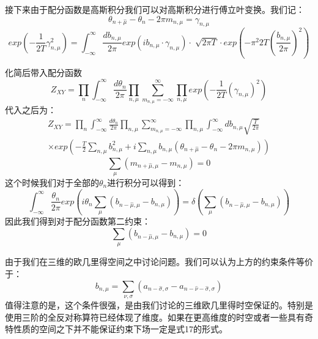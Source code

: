 \documentclass{article}
\begin{document}
接下来由于配分函数是高斯积分我们可以对高斯积分进行傅立叶变换。我们记：
\begin{equation}
    \theta_{n+ \hat \mu} - \theta_n - 2\pi m_{n,\mu} = \gamma_{n,\mu}
\end{equation}
\begin{equation}
    exp(-\frac{1}{2T} \gamma_{n,\mu}^2) = \int_{- \infty}^{\infty} \frac{d b_{n,\mu}}{2 \pi}  exp{(i b_{n,\mu} \cdot \gamma_{n,\mu}) } \cdot \sqrt[]{2 \pi T} \cdot exp{(- \pi^2 2 T (\frac{b_{n,\mu}}{2 \pi})^2)}
\end{equation}

化简后带入配分函数
\begin{equation}
    Z_{XY} = \prod_n \int_{- \infty}^{\infty} \frac{d \theta_n}{2 \pi} \prod_{n,\mu} \sum_{m_{n,\mu} = -\infty}^{\infty}  \prod_{n,\mu} exp ( - \frac{1}{2T}(\gamma_{n,\mu})^2 )
\end{equation}
代入之后为：
\begin{equation}
    \begin{split}
        Z_{XY} = \prod_n \int_{- \infty}^{\infty} \frac{d \theta_n}{2 \pi} \prod_{n,\mu} \sum_{m_{n,\mu} = -\infty}^{\infty}  \prod_{n,\mu} \int_{- \infty}^{\infty} db_{n,\mu} \sqrt{\frac{T}{2 \pi}} \\
        \times exp\left( -\frac{T}{2} \sum_{n,\mu}b_{n,\mu}^2 + i \sum_{n,\mu} b_{n,\mu} \left( \theta_{n+\hat \mu} - \theta_n - 2 \pi m_{n,\mu} \right) \right)   
    \end{split}
\end{equation}
\begin{equation}
    \sum_{\mu} (m_{n+\hat \mu, \mu} - m_{n,\mu}) = 0
\end{equation}
这个时候我们对于全部的$\theta_n$进行积分可以得到：
\begin{equation}
    \int_{-\infty}^{\infty} \frac{\theta_n}{2 \pi} exp \left( i \theta_n \sum_{\mu} \left( b_{n-\hat \mu,\mu} - b_{n,\mu}\right) \right)  = \delta \left( \sum_{\mu} \left( b_{n-\hat \mu,\mu} - b_{n,\mu}\right)\right) 
\end{equation}
因此我们得到对于配分函数第二约束：
\begin{equation}
    \sum_{\mu} \left( b_{n-\hat \mu,\mu} - b_{n,\mu}\right)= 0
\end{equation}

由于我们在三维的欧几里得空间之中讨论问题。我们可以认为上方的约束条件等价于：
\begin{equation}
    b_{n,\mu} = \sum_{\nu,\sigma} (a_{n-\hat \sigma,\sigma} - a_{n-\hat\nu - \hat \sigma,\sigma})
\end{equation}
值得注意的是，这个条件很强，是由我们讨论的三维欧几里得时空保证的。特别是使用三阶的全反对称算符已经体现了维度。如果在更高维度的时空或者一些具有奇特性质的空间之下并不能保证约束下场一定是式17的形式。
\end{document}
